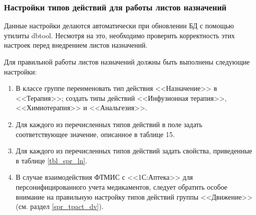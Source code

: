 \subsubsection{Настройки типов действий для работы листов назначений} 

\begin{vnim}
Данные настройки делаются автоматически при обновлении БД с помощью утилиты dbtool. Несмотря на это, необходимо проверить корректность этих настроек перед внедрением листов назначений.
\end{vnim}

Для правильной работы листов назначений должны быть выполнены следующие настройки:
\begin{enumerate}
 \item В классе  группе  переименовать тип действия <<Назначение>> в <<Терапия>>; создать типы действий <<Инфузионная терапия>>, <<Химиотерапия>> и <<Анальгезия>>.
 \item Для каждого из перечисленных типов действий в поле  задать соответствующее значение, описанное в таблице 15.
 \item Для каждого из перечисленных типов действий задать свойства, приведенные в таблице \ref{tbl_spr_ln}.
 \item В случае взаимодействия ФТМИС с <<1С:Аптека>> для персонифицированного учета медикаментов, следует обратить особое внимание на правильную настройку типов действий группы <<Движение>> (см. раздел \ref{spr_tpact_dv}).
\end{enumerate}

